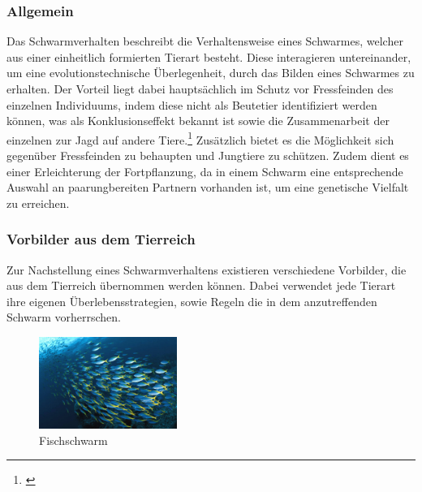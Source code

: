 \subsubsection{Allgemein}

Das Schwarmverhalten beschreibt die Verhaltensweise eines Schwarmes, welcher aus einer einheitlich formierten Tierart besteht.  Diese interagieren untereinander, um eine evolutionstechnische Überlegenheit, durch das Bilden eines Schwarmes zu erhalten. Der Vorteil liegt dabei hauptsächlich im Schutz vor Fressfeinden des einzelnen Individuums, indem diese nicht als Beutetier identifiziert werden können, was als Konklusionseffekt bekannt ist sowie die Zusammenarbeit der einzelnen zur Jagd auf andere Tiere.\footnote{\citep[vgl.][Schwarmverhalten]{Spektrum.SchwarmverhaltenKompaktlexikon}\label{note46}} Zusätzlich bietet es die Möglichkeit sich gegenüber Fressfeinden zu behaupten und Jungtiere zu schützen. Zudem dient es einer Erleichterung der Fortpflanzung, da in einem Schwarm eine entsprechende Auswahl an paarungbereiten Partnern vorhanden ist, um eine genetische Vielfalt zu erreichen.

\subsubsection{Vorbilder aus dem Tierreich}

Zur Nachstellung eines Schwarmverhaltens existieren verschiedene Vorbilder, die aus dem Tierreich übernommen werden können. Dabei verwendet jede Tierart ihre eigenen Überlebensstrategien, sowie Regeln die in dem anzutreffenden Schwarm vorherrschen.
\begin{figure}
	\begin{center}
		\includegraphics[width=0.4\textwidth]{images/technische_grundlagen/fischschwarm.jpg}
	\end{center}
	\caption{Fischschwarm}
	\label{fig:fischschwarm}
\end{figure}

\noindent
